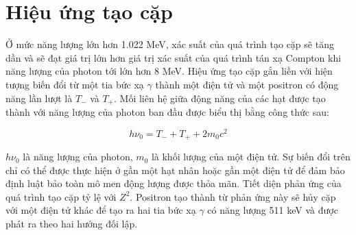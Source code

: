 \section{Hiệu ứng tạo cặp}

Ở mức năng lượng lớn hơn 1.022 MeV, xác suất của quá trình tạo cặp sẽ tăng dần và sẽ đạt giá trị lớn hơn giá trị xác suất của quá trình tán xạ Compton khi năng lượng của photon tới lớn hơn 8 MeV. Hiệu ứng tạo cặp gắn liền với hiện tượng biến đổi từ một tia bức xạ $\gamma$ thành một điện tử và một positron có động năng lần lượt là $T_{-}$ và $T_{+}$. Mối liên hệ giữa động năng của các hạt được tạo thành với năng lượng của photon ban đầu được biểu thị bằng công thức sau:

\begin{equation}
h\nu_{0} = T_{-} + T_{+} + 2m_{0}c^{2}
\end{equation}

$h\nu_{0}$ là năng lượng của photon, $m_{0}$ là khối lượng của một điện tử. Sự biến đổi trên chỉ có thể được thực hiện ở gần một hạt nhân hoặc gần một điện tử để đảm bảo định luật bảo toàn mô men động lượng được thỏa mãn. Tiết diện phản ứng của quá trình tạo cặp tỷ lệ với $Z^{2}$. Positron tạo thành từ phản ứng này sẽ hủy cặp với một điện tử khác để tạo ra hai tia bức xạ $\gamma$ có năng lượng 511 keV và được phát ra theo hai hướng đối lập.